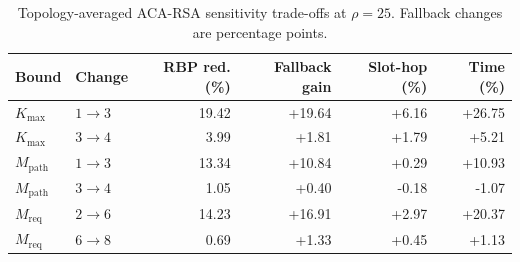 \begin{table}[t]
\centering
\caption{Topology-averaged ACA-RSA sensitivity trade-offs at $\rho=25$. Fallback changes are percentage points.}
\label{tab:aca_sensitivity_tradeoff}
\scriptsize
\setlength{\tabcolsep}{3.2pt}
\begin{tabular}{llrrrr}
\toprule
Bound & Change & RBP red. (\%) & Fallback gain & Slot-hop (\%) & Time (\%) \\
\midrule
$K_{\max}$ & $1\rightarrow3$ & 19.42 & +19.64 & +6.16 & +26.75 \\
$K_{\max}$ & $3\rightarrow4$ & 3.99 & +1.81 & +1.79 & +5.21 \\
$M_{\mathrm{path}}$ & $1\rightarrow3$ & 13.34 & +10.84 & +0.29 & +10.93 \\
$M_{\mathrm{path}}$ & $3\rightarrow4$ & 1.05 & +0.40 & -0.18 & -1.07 \\
$M_{\mathrm{req}}$ & $2\rightarrow6$ & 14.23 & +16.91 & +2.97 & +20.37 \\
$M_{\mathrm{req}}$ & $6\rightarrow8$ & 0.69 & +1.33 & +0.45 & +1.13 \\
\bottomrule
\end{tabular}
\end{table}
